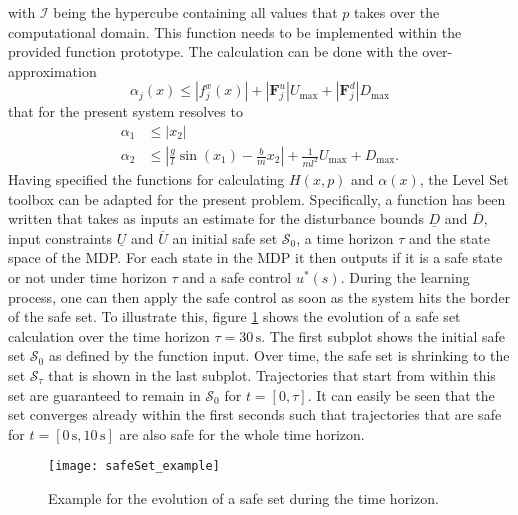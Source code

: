 \documentclass[../main.tex]{subfiles}
\begin{document}
with $\mathcal{I}$ being the hypercube containing all values that $p$ takes over the computational domain. This function needs to be implemented within the provided function prototype. The calculation can be done with the over-approximation
\begin{equation}
    \alpha_j(x) \leq |f_j^x(x)| + |\textbf{F}_j^u|U_{\text{max}} + |\textbf{F}_j^d|D_{\text{max}} 
\end{equation}
that for the present system resolves to 
\begin{align}
    \alpha_1 &\leq |x_2|\\
    \alpha_2 &\leq \left|\frac{g}{l}\sin(x_1)-\frac{b}{m}x_2\right| + \frac{1}{ml^2}U_{\text{max}} + D_{\text{max}}.
\end{align}
Having specified the functions for calculating $H(x,p)$ and $\alpha(x)$, the Level Set toolbox can be adapted for the present problem. Specifically, a function has been written that takes as inputs an estimate for the disturbance bounds $\underline{D}$ and $\overline{D}$, input constraints $\underline{U}$ and $\overline{U}$ an initial safe set $\mathcal{S}_0$, a time horizon $\tau$ and the state space of the MDP. For each state in the MDP it then outputs if it is a safe state or not under time horizon $\tau$ and a safe control $u^*(s)$. During the learning process, one can then apply the safe control as soon as the system hits the border of the safe set. To illustrate this, figure \ref{fig:safeSet_example} shows the evolution of a safe set calculation over the time horizon $\tau = 30\,\text{s}$. The first subplot shows the initial safe set $\mathcal{S}_0$ as defined by the function input. Over time, the safe set is shrinking to the set $\mathcal{S}_\tau$ that is shown in the last subplot. Trajectories that start from within this set are guaranteed to remain in $\mathcal{S}_0$ for $t = [0, \tau]$. It can easily be seen that the set converges already within the first seconds such that trajectories that are safe for $t = [0\,\text{s}, 10\,\text{s}]$ are also safe for the whole time horizon. 

\begin{figure}[H]
    \centering
    \texttt{[image: safeSet\_example]}
        \caption{Example for the evolution of a safe set during the time horizon.}    
    \label{fig:safeSet_example}
\end{figure}
\end{document}
